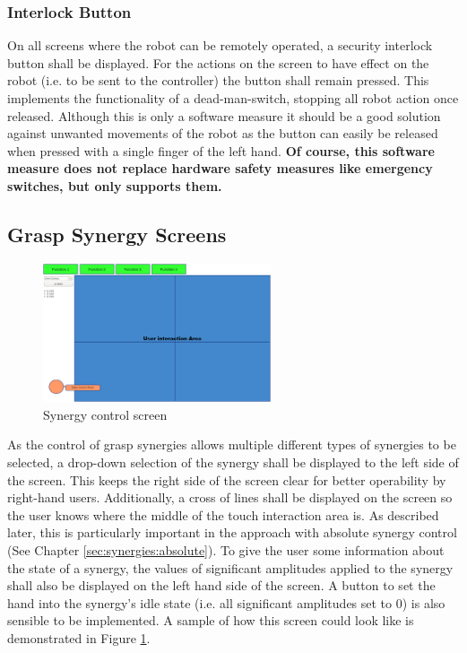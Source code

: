 \subsubsection{Interlock Button}
On all screens where the robot can be remotely operated, a security interlock button shall be displayed. For the actions on the screen to have effect on the robot (i.e. to be sent to the controller) the button shall remain pressed. This implements the functionality of a dead-man-switch, stopping all robot action once released. Although this is only a software measure it should be a good solution against unwanted movements of the robot as the button can easily be released when pressed with a single finger of the left hand. \textbf{Of course, this software measure does not replace hardware safety measures like emergency switches, but only supports them.}

\subsection{Grasp Synergy Screens}

\begin{figure}
	\caption{\label{fig:screen:synergy}Synergy control screen}
	\includegraphics[width=0.6\textwidth]{assets/chpt_concepts/grasp_synergy_page}
\end{figure}

As the control of grasp synergies allows multiple different types of synergies to be selected, a drop-down selection of the synergy shall be displayed to the left side of the screen. This keeps the right side of the screen clear for better operability by right-hand users. Additionally, a cross of lines shall be displayed on the screen so the user knows where the middle of the touch interaction area is. As described later, this is particularly important in the approach with absolute synergy control (See Chapter \ref{sec:synergies:absolute}). To give the user some information about the state of a synergy, the values of significant amplitudes applied to the synergy shall also be displayed on the left hand side of the screen. A button to set the hand into the synergy's idle state (i.e. all significant amplitudes set to $0$) is also sensible to be implemented. A sample of how this screen could look like is demonstrated in Figure \ref{fig:screen:synergy}.

